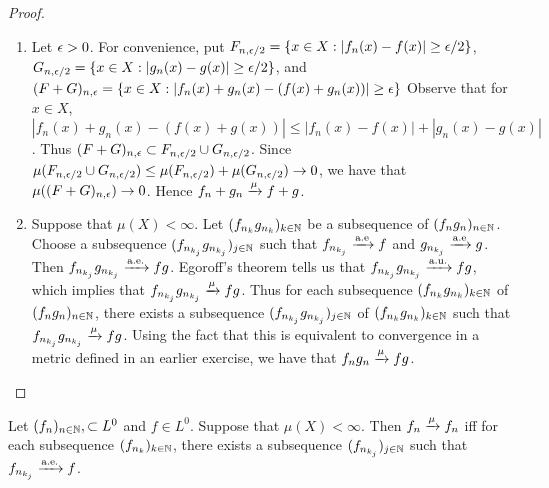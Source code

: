 \documentclass{book}
\begin{document}
	\begin{proof}
		
		\begin{enumerate}
			\item Let $\epsilon > 0$. For convenience, put $F_{n,\epsilon/2} = \{x \in X: |f_n(x) - f(x)| \geq \epsilon/2\}$, $G_{n, \epsilon/2} = \{x \in X: |g_n(x) - g(x)| \geq \epsilon/2\}$, and $(F+G)_{n,\epsilon} = \{x \in X: |f_n(x)+g_n(x) - (f(x) + g_n(x))| \geq \epsilon\}$ Observe that for $x \in X$, $|f_n(x) + g_n(x) - (f(x) + g(x))| \leq |f_n(x) - f(x)| + |g_n(x) - g(x)|$. Thus $(F+G)_{n,\epsilon} \subset F_{n,\epsilon/2} \cup G_{n, \epsilon/2}$. Since $\mu(F_{n,\epsilon/2} \cup G_{n, \epsilon/2}) \leq \mu(F_{n,\epsilon/2}) + \mu(G_{n, \epsilon/2}) \rightarrow 0$, we have that $\mu((F+G)_{n,\epsilon}) \rightarrow 0$. Hence $f_n + g_n \xrightarrow{\mu} f+g$.
			
			\item Suppose that $\mu(X) < \infty$. Let $(f_{n_k}g_{n_k})_{k \in \mathbb{N}}$ be a subsequence of $(f_ng_n)_{n \in \mathbb{N}}$. Choose a subsequence $(f_{n_{k_j}}g_{n_{k_j}})_{j \in \mathbb{N}}$ such that $f_{n_{k_j}} \xrightarrow{\text{a.e}} f$ and $g_{n_{k_j}} \xrightarrow{\text{a.e}} g$. Then $f_{n_{k_j}}g_{n_{k_j}} \xrightarrow{\text{a.e.}} fg$. Egoroff's theorem tells us that $f_{n_{k_j}}g_{n_{k_j}} \xrightarrow{\text{a.u.}} fg$, which implies that $f_{n_{k_j}}g_{n_{k_j}} \xrightarrow{\mu} fg$. Thus for each subsequence $(f_{n_k}g_{n_k})_{k \in \mathbb{N}}$ of $(f_ng_n)_{n \in \mathbb{N}}$, there exists a subsequence $(f_{n_{k_j}}g_{n_{k_j}})_{j \in \mathbb{N}}$ of $(f_{n_k}g_{n_k})_{k \in \mathbb{N}}$ such that $f_{n_{k_j}}g_{n_{k_j}} \xrightarrow{\mu} fg$. Using the fact that this is equivalent to convergence in a metric defined in an earlier exercise,
			we have that $f_ng_n \xrightarrow{\mu} fg$.
		\end{enumerate}
		
	\end{proof}
	
	\begin{ex}  
		Let $(f_n)_{n \in \mathbb{N}}, \subset L^0$ and $f \in L^0$. Suppose that $\mu(X) < \infty$. Then $f_n \xrightarrow{\mu}f_n$ iff for each subsequence $(f_{n_k})_{k \in \mathbb{N}}$, there exists a subsequence $(f_{n_{k_j}})_{j \in \mathbb{N}}$ such that $f_{n_{k_j}} \xrightarrow{\text{a.e.}} f$.
	\end{ex}
	
\end{document}

